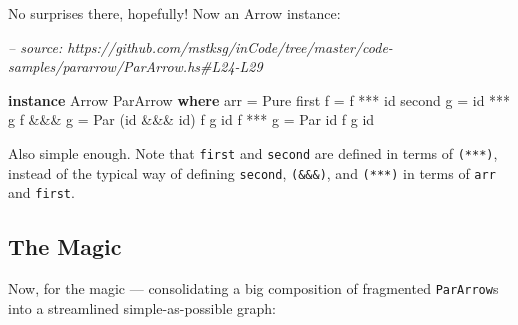 \documentclass[]{article}
\newenvironment{Shaded}{}{}
\newcommand{\CommentTok}[1]{\textcolor[rgb]{0.38,0.63,0.69}{\textit{#1}}}
\newcommand{\DataTypeTok}[1]{\textcolor[rgb]{0.56,0.13,0.00}{#1}}
\newcommand{\FunctionTok}[1]{\textcolor[rgb]{0.02,0.16,0.49}{#1}}
\newcommand{\KeywordTok}[1]{\textcolor[rgb]{0.00,0.44,0.13}{\textbf{#1}}}
\newcommand{\NormalTok}[1]{#1}
\begin{document}
No surprises there, hopefully! Now an Arrow instance:

\begin{Shaded}
\begin{Highlighting}[]
\CommentTok{-- source: https://github.com/mstksg/inCode/tree/master/code-samples/pararrow/ParArrow.hs#L24-L29}

\KeywordTok{instance} \DataTypeTok{Arrow} \DataTypeTok{ParArrow} \KeywordTok{where}
\NormalTok{    arr      }\FunctionTok{=} \DataTypeTok{Pure}
\NormalTok{    first f  }\FunctionTok{=}\NormalTok{ f  }\FunctionTok{***}\NormalTok{ id}
\NormalTok{    second g }\FunctionTok{=}\NormalTok{ id }\FunctionTok{***}\NormalTok{ g}
\NormalTok{    f }\FunctionTok{&&&}\NormalTok{ g  }\FunctionTok{=} \DataTypeTok{Par}\NormalTok{ (id }\FunctionTok{&&&}\NormalTok{ id) f g id}
\NormalTok{    f }\FunctionTok{***}\NormalTok{ g  }\FunctionTok{=} \DataTypeTok{Par}\NormalTok{ id          f g id}
\end{Highlighting}
\end{Shaded}

Also simple enough. Note that \texttt{first} and \texttt{second} are defined in
terms of \texttt{(***)}, instead of the typical way of defining \texttt{second},
\texttt{(\&\&\&)}, and \texttt{(***)} in terms of \texttt{arr} and
\texttt{first}.

\hypertarget{the-magic}{%
\subsection{The Magic}\label{the-magic}}

Now, for the magic --- consolidating a big composition of fragmented
\texttt{ParArrow}s into a streamlined simple-as-possible graph:
\end{document}
